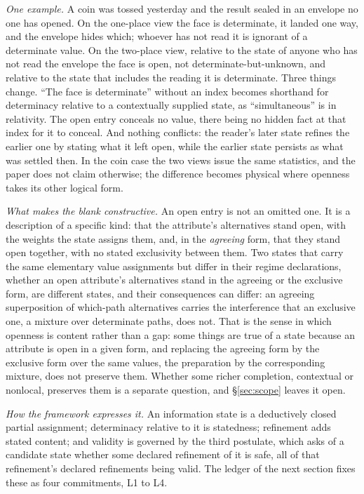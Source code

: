 \textit{One example.} A coin was tossed yesterday and the result sealed in an envelope no one has opened. On the one-place view the face is determinate, it landed one way, and the envelope hides which; whoever has not read it is ignorant of a determinate value. On the two-place view, relative to the state of anyone who has not read the envelope the face is open, not determinate-but-unknown, and relative to the state that includes the reading it is determinate. Three things change. ``The face is determinate'' without an index becomes shorthand for determinacy relative to a contextually supplied state, as ``simultaneous'' is in relativity. The open entry conceals no value, there being no hidden fact at that index for it to conceal. And nothing conflicts: the reader's later state refines the earlier one by stating what it left open, while the earlier state persists as what was settled then. In the coin case the two views issue the same statistics, and the paper does not claim otherwise; the difference becomes physical where openness takes its other logical form.

\textit{What makes the blank constructive.} An open entry is not an omitted one. It is a description of a specific kind: that the attribute's alternatives stand open, with the weights the state assigns them, and, in the \emph{agreeing} form, that they stand open together, with no stated exclusivity between them. Two states that carry the same elementary value assignments but differ in their regime declarations, whether an open attribute's alternatives stand in the agreeing or the exclusive form, are different states, and their consequences can differ: an agreeing superposition of which-path alternatives carries the interference that an exclusive one, a mixture over determinate paths, does not. That is the sense in which openness is content rather than a gap: some things are true of a state because an attribute is open in a given form, and replacing the agreeing form by the exclusive form over the same values, the preparation by the corresponding mixture, does not preserve them. Whether some richer completion, contextual or nonlocal, preserves them is a separate question, and \S\ref{sec:scope} leaves it open.

\textit{How the framework expresses it.} An information state is a deductively closed partial assignment; determinacy relative to it is statedness; refinement adds stated content; and validity is governed by the third postulate, which asks of a candidate state whether some declared refinement of it is safe, all of that refinement's declared refinements being valid. The ledger of the next section fixes these as four commitments, L1 to L4.

